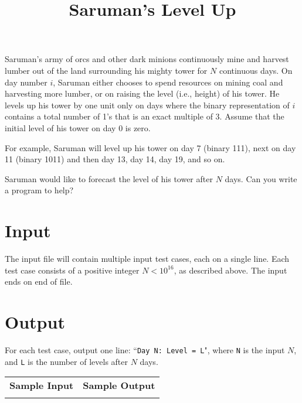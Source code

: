 \documentclass{article}
\title{Saruman's Level Up}
\date{}
\begin{document}
\maketitle

Saruman's army of orcs and other dark minions continuously mine and harvest
lumber out of the land surrounding his mighty tower for $N$ continuous days.
On day number $i$, Saruman either chooses to spend resources on mining coal and
harvesting more lumber, or on raising the level (i.e., height) of his tower.
He levels up his tower by one unit only on days where the binary representation
of $i$ contains a total number of 1's that is an exact multiple of 3.  Assume
that the initial level of his tower on day 0 is zero.

For example, Saruman will level up his tower on day 7 (binary 111), 
next on day 11 (binary 1011) and then day 13, day 14, day 19, and so 
on.

Saruman would like to forecast the level of his tower after $N$ 
days.  Can you write a program to help?

\section{Input}

The input file will contain multiple input test cases, each on a single line.
Each test case consists of a positive integer $N < 10^{16}$, as described
above. The input ends on end of file.

\section{Output}

For each test case, output one line: ``\verb+Day N: Level = L+", where \verb+N+ is 
the input $N$, and \verb+L+ is the number of levels after $N$ days.

\vskip 16pt
\noindent
\setlength{\extrarowheight}{4pt}
\begin{tabularx}{\textwidth}{ | X | X | }
\hline
\textbf{Sample Input} & \textbf{Sample Output} \\

&

\\
\hline
\end{tabularx}
\end{document}
